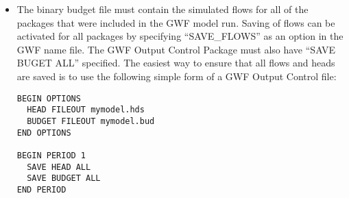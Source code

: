 \begin{itemize}
\begin{itemize}
\item The binary budget file must contain the simulated flows for all of the packages that were included in the GWF model run.  Saving of flows can be activated for all packages by specifying ``SAVE\_FLOWS'' as an option in the GWF name file.  The GWF Output Control Package must also have ``SAVE BUGET ALL'' specified.  The easiest way to ensure that all flows and heads are saved is to use the following simple form of a GWF Output Control file:

\begin{verbatim}
BEGIN OPTIONS
  HEAD FILEOUT mymodel.hds
  BUDGET FILEOUT mymodel.bud
END OPTIONS

BEGIN PERIOD 1
  SAVE HEAD ALL
  SAVE BUDGET ALL
END PERIOD
\end{verbatim}


\end{itemize}
\end{itemize}
